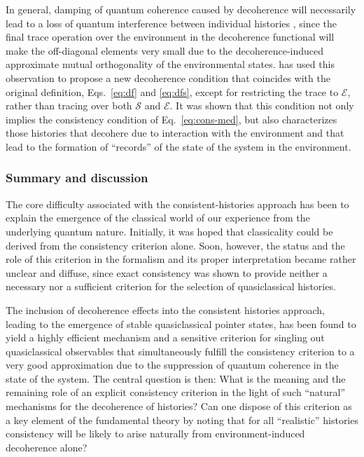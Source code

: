 \documentclass[rmp,aps,amsmath,amsfonts,noshowkeys,noshowpacs,12pt]{revtex4}
\begin{document}
In general, damping of quantum coherence caused by decoherence will
necessarily lead to a loss of quantum interference between individual
histories \citep[but not vice versa---see the discussion
by][]{Twamley:1993:bz}, since the final trace operation over the
environment in the decoherence functional will make the off-diagonal
elements very small due to the decoherence-induced approximate mutual
orthogonality of the environmental states.
\citet{Finkelstein:1993:gc} has used this observation to propose a new
decoherence condition that coincides with the original definition,
Eqs.~\eqref{eq:df} and \eqref{eq:dfs}, except for restricting the
trace to $\mathcal{E}$, rather than tracing over both $\mathcal{S}$
and $\mathcal{E}$. It was shown that this condition not only implies
the consistency condition of Eq.~\eqref{eq:cons-med}, but also
characterizes those histories that decohere due to interaction with
the environment and that lead to the formation of ``records'' of the
state of the system in the environment.


\subsubsection{Summary and discussion}

The core difficulty associated with the consistent-histories approach
has been to explain the emergence of the classical world of our
experience from the underlying quantum nature. Initially, it was hoped
that classicality could be derived from the consistency criterion
alone.  Soon, however, the status and the role of this criterion in
the formalism and its proper interpretation became rather unclear and
diffuse, since exact consistency was shown to provide neither a
necessary nor a sufficient criterion for the selection of
quasiclassical histories.

The inclusion of decoherence effects into the consistent histories
approach, leading to the emergence of stable quasiclassical pointer
states, has been found to yield a highly efficient mechanism and a
sensitive criterion for singling out quasiclassical observables that
simultaneously fulfill the consistency criterion to a very good
approximation due to the suppression of quantum coherence in the state
of the system. The central question is then: What is the meaning and
the remaining role of an explicit consistency criterion in the light
of such ``natural'' mechanisms for the decoherence of histories? Can
one dispose of this criterion as a key element of the fundamental
theory by noting that for all ``realistic'' histories consistency will
be likely to arise naturally from environment-induced decoherence
alone?
\end{document}
